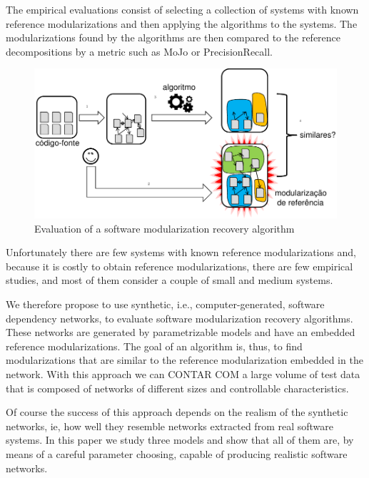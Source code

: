 The empirical evaluations consist of selecting a collection of systems with
known reference modularizations and then applying the algorithms to the systems.
The modularizations found by the algorithms are then compared to the reference
decompositions by a metric such as MoJo \cite{Tzerpos1999} or PrecisionRecall.

  \begin{figure}[!t]
  \centering
  \includegraphics[width=1.0\textwidth]{diagram}
  \caption{Evaluation of a software modularization recovery algorithm}
  \label{fig:diagram}
  \end{figure}


Unfortunately there are few systems with known reference modularizations and,
because it is costly to obtain reference modularizations, there are few
empirical studies, and most of them consider a couple of small and medium
systems.

We therefore propose to use synthetic, i.e., computer-generated, software
dependency networks, to evaluate software modularization recovery algorithms.
These networks are generated by parametrizable models and have an embedded
reference modularizations. The goal of an algorithm is, thus, to find
modularizations that are similar to the reference modularization embedded in the
network. With this approach we can CONTAR COM a large volume of test data that
is composed of networks of different sizes and controllable characteristics.

Of course the success of this approach depends on the realism of the synthetic
networks, ie, how well they resemble networks extracted from real software
systems. In this paper we study three models and show that all of them are, by
means of a careful parameter choosing, capable of producing realistic software
networks.

